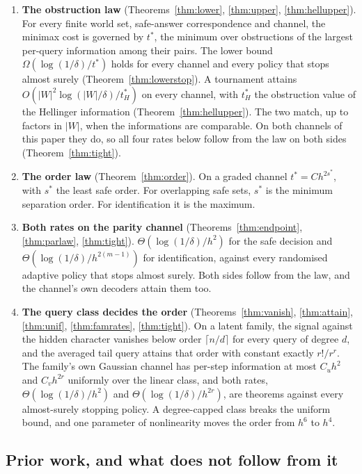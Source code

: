 \begin{enumerate}
\item[1)] \textbf{The obstruction law} (Theorems~\ref{thm:lower}, \ref{thm:upper},
\ref{thm:hellupper}). For every
finite world set, safe-answer correspondence and channel, the minimax cost is governed by
$t^{*}$, the minimum over obstructions of the largest per-query information among their pairs.
The lower bound $\Omega(\log(1/\delta)/t^{*})$ holds for every channel and every policy that
stops almost surely (Theorem~\ref{thm:lowerstop}). A
tournament attains $O(|W|^{2}\log(|W|/\delta)/t^{*}_{H})$ on every channel, with $t^{*}_{H}$ the
obstruction value of the Hellinger information (Theorem~\ref{thm:hellupper}). The two match,
up to factors in $|W|$, when the informations are comparable. On both channels of this paper they do, so all four
rates below follow from the law on both sides (Theorem~\ref{thm:tight}).
\item[2)] \textbf{The order law} (Theorem~\ref{thm:order}). On a graded channel $t^{*}=Ch^{2s^{*}}$,
with $s^{*}$ the least safe order. For overlapping safe sets, $s^{*}$ is the minimum
separation order. For identification it is the maximum.
\item[3)] \textbf{Both rates on the parity channel} (Theorems~\ref{thm:endpoint},
\ref{thm:parlaw}, \ref{thm:tight}). $\Theta(\log(1/\delta)/h^{2})$ for the safe decision and
$\Theta(\log(1/\delta)/h^{2(m-1)})$ for identification, against every randomised adaptive policy
that stops almost surely. Both sides follow from the law, and the channel's own decoders attain
them too.
\item[4)] \textbf{The query class decides the order} (Theorems~\ref{thm:vanish},
\ref{thm:attain}, \ref{thm:unif}, \ref{thm:famrates}, \ref{thm:tight}). On a latent family, the signal against
the hidden character vanishes below order $\lceil n/d\rceil$ for every query of degree $d$, and
the averaged tail query attains that order with constant exactly $r!/r^{r}$. The family's own
Gaussian channel has per-step information at most $C_{u}h^{2}$ and $C_{v}h^{2r}$ uniformly over
the linear class, and both rates, $\Theta(\log(1/\delta)/h^{2})$ and
$\Theta(\log(1/\delta)/h^{2r})$, are theorems against every almost-surely stopping policy. A
degree-capped class breaks the uniform bound, and one parameter of nonlinearity moves the order
from $h^{6}$ to $h^{4}$.
\end{enumerate}

\subsection{Prior work, and what does not follow from it}

